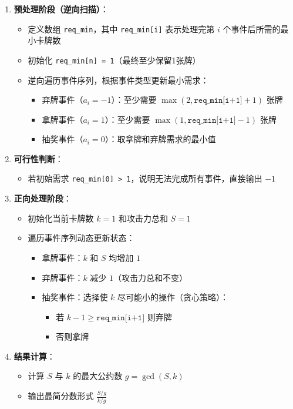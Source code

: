 \documentclass[../mainReport.tex]{subfiles}
\begin{document}
\begin{enumerate}
    \item \textbf{预处理阶段（逆向扫描）}：
    \begin{itemize}
        \item 定义数组 \texttt{req\_min}，其中 \texttt{req\_min[i]} 表示处理完第 $i$ 个事件后所需的最小卡牌数
        \item 初始化 \texttt{req\_min[n] = 1}（最终至少保留1张牌）
        \item 逆向遍历事件序列，根据事件类型更新最小需求：
        \begin{itemize}
            \item 弃牌事件（$a_i = -1$）：至少需要 $\max(2, \texttt{req\_min[i+1]} + 1)$ 张牌
            \item 拿牌事件（$a_i = 1$）：至少需要 $\max(1, \texttt{req\_min[i+1]} - 1)$ 张牌
            \item 抽奖事件（$a_i = 0$）：取拿牌和弃牌需求的最小值
        \end{itemize}
    \end{itemize}

    \item \textbf{可行性判断}：
    \begin{itemize}
        \item 若初始需求 \texttt{req\_min[0] > 1}，说明无法完成所有事件，直接输出 $-1$
    \end{itemize}

    \item \textbf{正向处理阶段}：
    \begin{itemize}
        \item 初始化当前卡牌数 $k = 1$ 和攻击力总和 $S = 1$
        \item 遍历事件序列动态更新状态：
        \begin{itemize}
            \item 拿牌事件：$k$ 和 $S$ 均增加 $1$
            \item 弃牌事件：$k$ 减少 $1$（攻击力总和不变）
            \item 抽奖事件：选择使 $k$ 尽可能小的操作（贪心策略）：
            \begin{itemize}
                \item 若 $k - 1 \geq \texttt{req\_min[i+1]}$ 则弃牌
                \item 否则拿牌
            \end{itemize}
        \end{itemize}
    \end{itemize}

    \item \textbf{结果计算}：
    \begin{itemize}
        \item 计算 $S$ 与 $k$ 的最大公约数 $g = \gcd(S, k)$
        \item 输出最简分数形式 $\frac{S/g}{k/g}$
    \end{itemize}
\end{enumerate}
\end{document}
